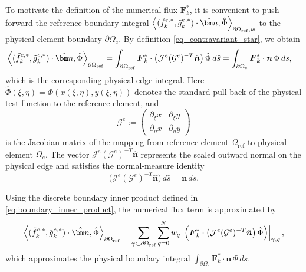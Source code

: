 \documentclass[fleqn,11pt]{amsart}
\newcommand{\omgr}{\Omega_{\mathrm{ref}}}
\begin{document}
To motivate the definition of the numerical flux $\boldsymbol F_k^{*}$, it is
convenient to push forward the reference boundary integral
$\left\langle (\Tilde{f}_k^{e,*},\Tilde{g}_k^{e,*})\cdot \hat{\bm n}, \hat\Phi \right\rangle_{\partial\Omega_{\mathrm{ref}},w}$
to the physical element boundary $\partial\Omega_e$. By definition \eqref{eq_contravariant_star}, we obtain
\begin{align}
\label{eq_map}
\left\langle (\Tilde{f}_k^{e,*},\Tilde{g}_k^{e,*})\cdot \hat{\bm n}, \hat\Phi \right\rangle_{\partial\Omega_{\mathrm{ref}}}
&=
\int_{\partial\Omega_{\mathrm{ref}}}
\boldsymbol F_k^{*} \cdot
\bigl(\mathcal{J}^e(\mathcal{G}^e)^{-T} \hat{\boldsymbol n}\bigr)\,
\hat\Phi\, d\hat s =
\int_{\partial\Omega_e}
\boldsymbol F_k^{*} \cdot \boldsymbol n\, \Phi\, ds,
\end{align}
which is the corresponding physical-edge integral.
Here $\hat\Phi(\xi,\eta) = \Phi(x(\xi,\eta),y(\xi,\eta))$ denotes the standard
pull-back of the physical test function to the reference element, and
\[
\mathcal{G}^e
:=
\begin{pmatrix}
\partial_\xi x & \partial_\xi y \\
\partial_\eta x & \partial_\eta y
\end{pmatrix}
\]
is the Jacobian matrix of the mapping from reference element $\omgr$ to 
physical element $\Omega_e$.
The vector $\mathcal{J}^e(\mathcal{G}^e)^{-T} \hat{\boldsymbol n}$ represents the
scaled outward normal on the physical edge and satisfies the normal-measure
identity
\[
\bigl(\mathcal{J}^e(\mathcal{G}^e)^{-T} \hat{\boldsymbol n}\bigr)\, d\hat s
=
\boldsymbol n\, ds.
\]

Using the discrete boundary inner product defined in
\eqref{eq:boundary_inner_product}, the numerical flux term is approximated by
\begin{align}
\left\langle (\Tilde{f}_k^{e,*},\Tilde{g}_k^{e,*})\cdot \hat{\bm n}, \hat\Phi \right\rangle_{\partial\Omega_{\mathrm{ref}}}
=
\sum_{\gamma \subset \partial\Omega_{\mathrm{ref}}}
\sum_{q=0}^{N}
w_q \,
\left.
\Bigl(
\boldsymbol F_k^{*} \cdot
\bigl(\mathcal{J}^e(\mathcal{G}^e)^{-T} \hat{\boldsymbol n}\bigr)\,
\hat\Phi
\Bigr)
\right|_{\gamma,q},
\label{phy}
\end{align}
which approximates the physical boundary integral
$\int_{\partial\Omega_e} \bm F_k^* \cdot \bm n \, \Phi \, ds$.
\end{document}
